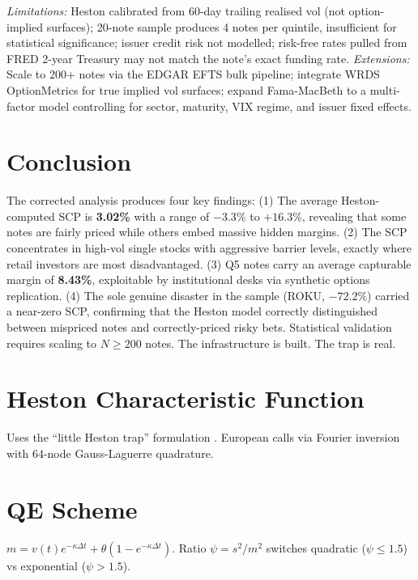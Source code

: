 \documentclass[10pt,a4paper]{article}
\begin{document}
\textit{Limitations:} Heston calibrated from 60-day trailing realised vol (not option-implied surfaces); 20-note sample produces 4 notes per quintile, insufficient for statistical significance; issuer credit risk not modelled; risk-free rates pulled from FRED 2-year Treasury may not match the note's exact funding rate. \textit{Extensions:} Scale to 200+ notes via the EDGAR EFTS bulk pipeline; integrate WRDS OptionMetrics for true implied vol surfaces; expand Fama-MacBeth to a multi-factor model controlling for sector, maturity, VIX regime, and issuer fixed effects.

\section{Conclusion}
The corrected analysis produces four key findings: (1) The average Heston-computed SCP is \textbf{3.02\%} with a range of $-3.3\%$ to $+16.3\%$, revealing that some notes are fairly priced while others embed massive hidden margins. (2) The SCP concentrates in high-vol single stocks with aggressive barrier levels, exactly where retail investors are most disadvantaged. (3) Q5 notes carry an average capturable margin of \textbf{8.43\%}, exploitable by institutional desks via synthetic options replication. (4) The sole genuine disaster in the sample (ROKU, $-72.2\%$) carried a near-zero SCP, confirming that the Heston model correctly distinguished between mispriced notes and correctly-priced risky bets. Statistical validation requires scaling to $N \geq 200$ notes. The infrastructure is built. The trap is real.

\newpage\appendix
\section{Heston Characteristic Function}
Uses the ``little Heston trap'' formulation \citep{albrecher2007}. European calls via Fourier inversion with 64-node Gauss-Laguerre quadrature.

\section{QE Scheme}
$m = v(t)e^{-\kappa\Delta t}+\theta(1-e^{-\kappa\Delta t})$. Ratio $\psi=s^2/m^2$ switches quadratic ($\psi\leq1.5$) vs exponential ($\psi>1.5$).
\end{document}
